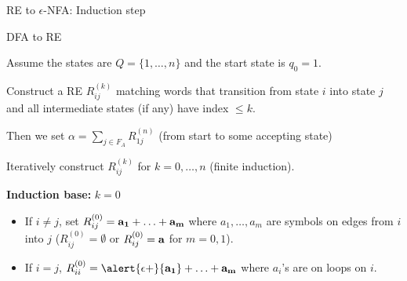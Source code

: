 \documentclass[handout]{beamer}
\begin{document}
\begin{frame}{RE to $\epsilon$-NFA: Induction step}
\end{frame}


\begin{frame}{DFA to RE}

    Assume the states are  $Q=\{1,\ldots,n\}$ and the start state is $q_0=1$. 
    
    Construct a RE \alert{$R_{ij}^{(k)}$} matching words that transition from state $i$ into state $j$ and all intermediate states (if any) have index $\leq k$.

    Then we set \alert{$\alpha=\sum_{j\in F_A}R_{1j}^{(n)}$} (from start to some accepting state)

    Iteratively construct $R_{ij}^{(k)}$ for $k=0,\ldots,n$ (finite induction).

    \textbf{Induction base:} $k=0$
    \begin{itemize}
        \item If \alert{$i\neq j$}, set $R_{ij}^{(0)}={\bf a_1}+\ldots+{\bf a_m}$ where $a_1,\dots,a_m$ are symbols on edges from $i$ into $j$ ($R_{ij}^{(0)}=\emptyset$ or $R_{ij}^{(0)}={\bf a}$ for $m=0,1$).
        \item If \alert{$i=j$}, $R_{ii}^{(0)}=\alert{\epsilon+}{\bf a_1}+\ldots+{\bf a_m}$ where $a_i$'s are on loops on $i$.
    \end{itemize}

\end{frame}
\end{document}
